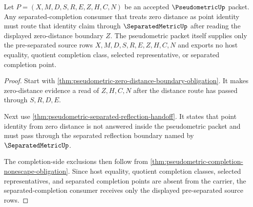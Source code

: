 \begin{theorem}
\label{thm:pseudometric-separated-completion-source}
Let $P=(X,M,D,S,R,E,Z,H,C,N)$ be an accepted $\PseudometricUp$ packet. Any separated-completion consumer that treats zero distance as point identity must route that identity claim through $\SeparatedMetricUp$ after reading the displayed zero-distance boundary $Z$. The pseudometric packet itself supplies only the pre-separated source rows $X,M,D,S,R,E,Z,H,C,N$ and exports no host equality, quotient completion class, selected representative, or separated completion point.
\end{theorem}
\begin{proof}
Start with \autoref{thm:pseudometric-zero-distance-boundary-obligation}. It makes zero-distance evidence a read of $Z,H,C,N$ after the distance route has passed through $S,R,D,E$.

Next use \autoref{thm:pseudometric-separated-reflection-handoff}. It states that point identity from zero distance is not answered inside the pseudometric packet and must pass through the separated reflection boundary named by $\SeparatedMetricUp$.

The completion-side exclusions then follow from \autoref{thm:pseudometric-completion-nonescape-obligation}. Since host equality, quotient completion classes, selected representatives, and separated completion points are absent from the carrier, the separated-completion consumer receives only the displayed pre-separated source rows.
\end{proof}

